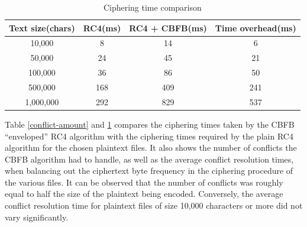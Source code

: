 \documentclass[conference]{IEEEtran}
\begin{document}
\begin{table}[!t]
\centering
\begin{tabular}{|c|c|c|c|}
\hline
Text size(chars) & RC4(ms) & RC4 + CBFB(ms) & Time overhead(ms) \\ \hline
10,000                                                      & 8        & 14  & 6                                                         \\ \hline
50,000                                                      & 24       & 45  & 21                                                          \\ \hline
100,000                                                     & 36       & 86  &  50                                                         \\ \hline
500,000                                                     & 168      & 409  &  241                                                        \\ \hline
1,000,000                                                   & 292      & 829  &  537                                                        \\ \hline
\end{tabular}
\caption{Ciphering time comparison}
\label{ciphering-time-comparison}
\end{table}

Table \ref{conflict-amount} and \ref{ciphering-time-comparison} compares the ciphering times taken by the CBFB “enveloped” RC4 algorithm with the ciphering times required by the plain RC4 algorithm for the chosen plaintext files. It also shows the number of conflicts the CBFB algorithm had to handle, as well as the average conflict resolution times, when balancing out the ciphertext byte frequency in the ciphering procedure of the various files. It can be observed that the number of conflicts was roughly equal to half the size of the plaintext being encoded. Conversely, the average conflict resolution time for plaintext files of size 10,000 characters or more did not vary significantly.
\end{document}
